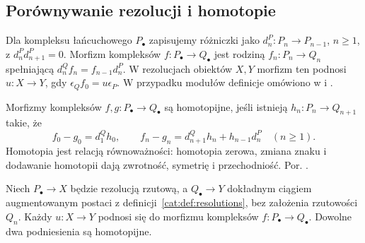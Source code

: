 \subsection{Porównywanie rezolucji i homotopie}
Dla kompleksu łańcuchowego $P_\bullet$ zapisujemy różniczki jako $d_n^P:P_n\to P_{n-1}$, $n\ge1$, z $d_n^Pd_{n+1}^P=0$. Morfizm kompleksów $f:P_\bullet\to Q_\bullet$ jest rodziną $f_n:P_n\to Q_n$ spełniającą $d_n^Q f_n=f_{n-1}d_n^P$. W rezolucjach obiektów $X,Y$ morfizm ten podnosi $u:X\to Y$, gdy $\epsilon_Q f_0=u\epsilon_P$. W przypadku modułów definicje omówiono w  i .
\begin{definicja}\label{cat:def:resolution-homotopy}
Morfizmy kompleksów $f,g:P_\bullet\to Q_\bullet$ są homotopijne, jeśli istnieją $h_n:P_n\to Q_{n+1}$ takie, że
\begin{equation}\label{cat:eq:resolution-homotopy}
 f_0-g_0=d_1^Qh_0,\qquad
 f_n-g_n=d_{n+1}^Qh_n+h_{n-1}d_n^P\quad(n\ge1).
\end{equation}
Homotopia jest relacją równoważności: homotopia zerowa, zmiana znaku i dodawanie homotopii dają zwrotność, symetrię i przechodniość. Por. .
\end{definicja}
\begin{twierdzenie}\label{cat:thm:resolution-comparison}
Niech $P_\bullet\to X$ będzie rezolucją rzutową, a $Q_\bullet\to Y$ dokładnym ciągiem augmentowanym postaci z definicji~\ref{cat:def:resolutions}, bez założenia rzutowości $Q_n$. Każdy $u:X\to Y$ podnosi się do morfizmu kompleksów $f:P_\bullet\to Q_\bullet$. Dowolne dwa podniesienia są homotopijne.
\end{twierdzenie}

